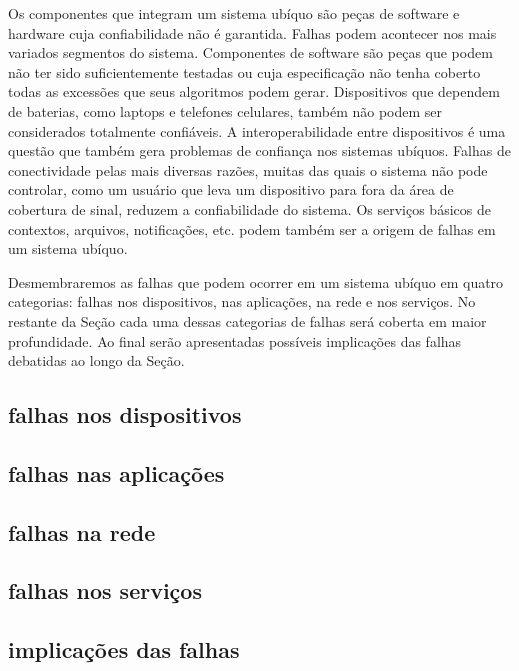 Os componentes que integram um sistema ubíquo são peças de software e hardware cuja confiabilidade não é garantida. Falhas podem acontecer nos mais variados segmentos do sistema. Componentes de software são peças que podem não ter sido suficientemente testadas ou cuja especificação não tenha coberto todas as excessões que seus algoritmos podem gerar. Dispositivos que dependem de baterias, como laptops e telefones celulares, também não podem ser considerados totalmente confiáveis. A interoperabilidade entre dispositivos é uma questão que também gera problemas de confiança nos sistemas ubíquos. Falhas de conectividade pelas mais diversas razões, muitas das quais o sistema não pode controlar, como um usuário que leva um dispositivo para fora da área de cobertura de sinal, reduzem a confiabilidade do sistema. Os serviços básicos de contextos, arquivos, notificações, etc. podem também ser a origem de falhas em um sistema ubíquo.

Desmembraremos as falhas que podem ocorrer em um sistema ubíquo em quatro categorias: falhas nos dispositivos, nas aplicações, na rede e nos serviços. No restante da Seção cada uma dessas categorias de falhas será coberta em maior profundidade. Ao final serão apresentadas possíveis implicações das falhas debatidas ao longo da Seção.

\subsection{falhas nos dispositivos} %
\label{sub:falhas_nos_dispositivos}


\subsection{falhas nas aplicações} %
\label{sub:falhas_nas_aplicacoes}


\subsection{falhas na rede} %
\label{sub:falhas_na_rede}


\subsection{falhas nos serviços} %
\label{sub:falhas_nos_servicos}


\subsection{implicações das falhas} %
\label{sub:implicacoes_das_falhas}


